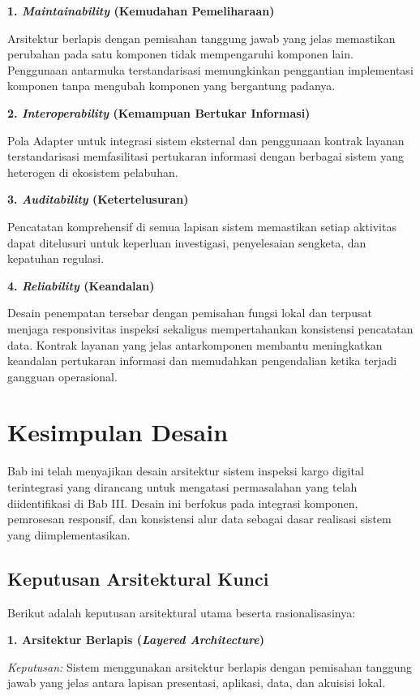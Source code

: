 \textbf{1. \textit{Maintainability} (Kemudahan Pemeliharaan)}

Arsitektur berlapis dengan pemisahan tanggung jawab yang jelas memastikan perubahan pada satu komponen tidak mempengaruhi komponen lain. Penggunaan antarmuka terstandarisasi memungkinkan penggantian implementasi komponen tanpa mengubah komponen yang bergantung padanya.

\textbf{2. \textit{Interoperability} (Kemampuan Bertukar Informasi)}

Pola Adapter untuk integrasi sistem eksternal dan penggunaan kontrak layanan terstandarisasi memfasilitasi pertukaran informasi dengan berbagai sistem yang heterogen di ekosistem pelabuhan.

\textbf{3. \textit{Auditability} (Ketertelusuran)}

Pencatatan komprehensif di semua lapisan sistem memastikan setiap aktivitas dapat ditelusuri untuk keperluan investigasi, penyelesaian sengketa, dan kepatuhan regulasi.

\textbf{4. \textit{Reliability} (Keandalan)}

Desain penempatan tersebar dengan pemisahan fungsi lokal dan terpusat menjaga responsivitas inspeksi sekaligus mempertahankan konsistensi pencatatan data. Kontrak layanan yang jelas antarkomponen membantu meningkatkan keandalan pertukaran informasi dan memudahkan pengendalian ketika terjadi gangguan operasional.

\section{Kesimpulan Desain}

Bab ini telah menyajikan desain arsitektur sistem inspeksi kargo digital terintegrasi yang dirancang untuk mengatasi permasalahan yang telah diidentifikasi di Bab III. Desain ini berfokus pada integrasi komponen, pemrosesan responsif, dan konsistensi alur data sebagai dasar realisasi sistem yang diimplementasikan.

\subsection{Keputusan Arsitektural Kunci}

Berikut adalah keputusan arsitektural utama beserta rasionalisasinya:

\textbf{1. Arsitektur Berlapis (\textit{Layered Architecture})}

\textit{Keputusan:} Sistem menggunakan arsitektur berlapis dengan pemisahan tanggung jawab yang jelas antara lapisan presentasi, aplikasi, data, dan akuisisi lokal.

